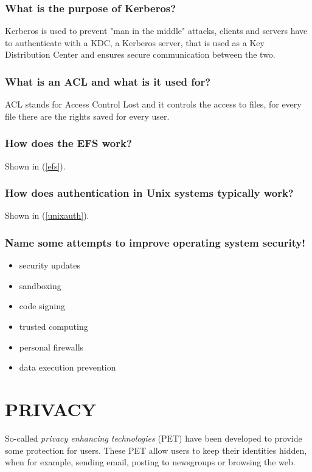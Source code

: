 \documentclass[a4paper, 10 pt, conference]{ieeeconf}
\begin{document}
\subsubsection{\textbf{What is the purpose of Kerberos?}}
Kerberos is used to prevent "man in the middle" attacks, clients and servers have to authenticate with a KDC, a Kerberos server, that is used as a Key Distribution Center and ensures secure communication between the two. 
\subsubsection{\textbf{What is an ACL and what is it used for?}}
ACL stands for Access Control Lost and it controls the access to files, for every file there are the rights saved for every user. 
\subsubsection{\textbf{How does the EFS work?}}
Shown in (\ref{efs}).
\subsubsection{\textbf{How does authentication in Unix systems typically work?}}
Shown in (\ref{unixauth}).
\subsubsection{\textbf{Name some attempts to improve operating system security!}}
\begin{itemize}
\item security updates
\item sandboxing
\item code signing
\item trusted computing
\item personal firewalls
\item data execution prevention
\end{itemize}

\pagebreak





\section{\textbf{PRIVACY}}
So-called \emph{privacy enhancing technologies} (PET) have been developed to provide some protection for users. These PET allow users to keep their identities hidden, when for example, sending email, posting to newsgroups or browsing the web. 
\end{document}
